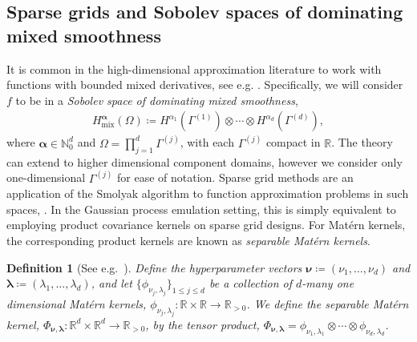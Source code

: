 \documentclass[pdflatex,sn-mathphys-num]{sn-jnl}%
\theoremstyle{thmstyleone}%
\theoremstyle{thmstyletwo}%
\theoremstyle{thmstylethree}%
\newtheorem{definition}{Definition}%
\begin{document}
\subsection{Sparse grids and Sobolev spaces of dominating mixed smoothness}\label{subsec: sparse grids and dominating mixed smoothness}
It is common in the high-dimensional approximation literature to work with functions with bounded mixed derivatives, see e.g.  \cite{Hackbush2012,dick2013high,Nobile2018}. Specifically, we will consider \(f\) to be in a \textit{Sobolev space of dominating mixed smoothness},
\begin{align}
    H^{\boldsymbol{\alpha}}_{\textrm{mix}}(\Omega) \coloneqq H^{\alpha_1}(\Gamma^{(1)})\otimes\cdots\otimes H^{\alpha_d}(\Gamma^{(d)}),\nonumber
\end{align}
where \(\boldsymbol{\alpha}\in\mathbb{N}_0^d\) and \(\Omega=\prod_{j=1}^d\Gamma^{(j)}\), with each \(\Gamma^{(j)}\) compact in \(\mathbb{R}\). The theory can extend to higher dimensional component domains, however we consider only one-dimensional \(\Gamma^{(j)}\) for ease of notation. Sparse grid methods are an application of the Smolyak algorithm to function approximation problems in such spaces, \cite{bungartz2004sparse,WASILKOWSKI19951, Nobile2008,rieger2017sampling}. In the Gaussian process emulation setting, this is simply equivalent to employing product covariance kernels on sparse grid designs. For Mat\'ern kernels, the corresponding product kernels are known as \textit{separable Mat\'ern kernels}.
\begin{definition}[See e.g.\ \cite{Teckentrup2020}]\label{def: separable matern}
    Define the hyperparameter vectors \(\boldsymbol{\nu}\coloneqq(\nu_1,\dots,\nu_d)\) and \(\boldsymbol{\lambda}\coloneqq(\lambda_1,\dots,\lambda_d)\), and let \(\{\phi_{\nu_j,\lambda_j}\}_{1\leq j\leq d}\) be a collection of \(d\)-many one dimensional Mat\'ern kernels, \(\phi_{\nu_j,\lambda_j}:\mathbb{R}\times\mathbb{R}\rightarrow\mathbb{R}_{>0}\). We define the \emph{separable Mat\'ern kernel}, \(\Phi_{\boldsymbol{\nu},\boldsymbol{\lambda}}:\mathbb{R}^d\times\mathbb{R}^d\rightarrow\mathbb{R}_{>0}\), by the tensor product, \(\Phi_{\boldsymbol{\nu},\boldsymbol{\lambda}}=\phi_{\nu_1,\lambda_1}\otimes\cdots\otimes\phi_{\nu_d,\lambda_d}\).
\end{definition}
\end{document}
